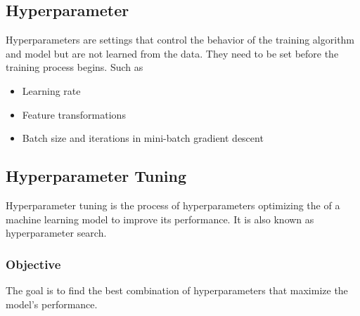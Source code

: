 \documentclass{article}
\begin{document}
\subsection*{Hyperparameter}
Hyperparameters are settings that control the behavior of the training algorithm and model but are not learned from the data. They need to be set before the training process begins. Such as 
\begin{itemize}
    \item Learning rate
    \item Feature transformations
    \item Batch size and iterations in mini-batch gradient descent
\end{itemize}
\subsection*{Hyperparameter Tuning}
Hyperparameter tuning is the process of hyperparameters optimizing the of a machine learning model to improve its performance. It is also known as hyperparameter search.
\subsubsection*{Objective} 
The goal is to find the best combination of hyperparameters that maximize the model's performance.
\end{document}
